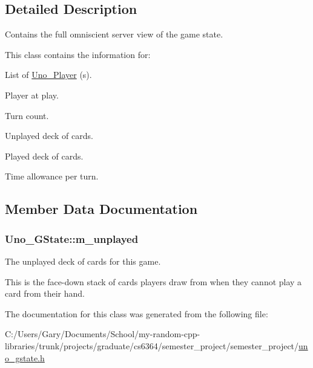 \subsection{\-Detailed \-Description}
\-Contains the full omniscient server view of the game state. 

\-This class contains the information for\-: \begin{DoxyItemize}
\item \-List of \hyperlink{class_uno___player}{\-Uno\-\_\-\-Player} (s). \item \-Player at play. \item \-Turn count. \item \-Unplayed deck of cards. \item \-Played deck of cards. \item \-Time allowance per turn. \end{DoxyItemize}


\subsection{\-Member \-Data \-Documentation}
\hypertarget{class_uno___g_state_afcc8256ce8ae779aa3e529f33a8818c1}{
\subsubsection[{m\-\_\-unplayed}]{ {\bf \-Uno\-\_\-\-G\-State\-::m\-\_\-unplayed}}}
\label{class_uno___g_state_afcc8256ce8ae779aa3e529f33a8818c1}


\-The unplayed deck of cards for this game. 

\-This is the face-\/down stack of cards players draw from when they cannot play a card from their hand. 

\-The documentation for this class was generated from the following file\-:\begin{DoxyCompactItemize}
\item 
\-C\-:/\-Users/\-Gary/\-Documents/\-School/my-\/random-\/cpp-\/libraries/trunk/projects/graduate/cs6364/semester\-\_\-project/semester\-\_\-project/\hyperlink{uno__gstate_8h}{uno\-\_\-gstate.\-h}\end{DoxyCompactItemize}
